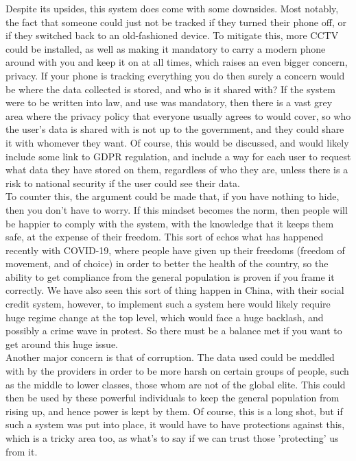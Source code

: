 
Despite its upsides, this system does come with some downsides.
Most notably, the fact that someone could just not be tracked if they turned their phone off, or if they switched
back to an old-fashioned device.
To mitigate this, more CCTV could be installed, as well as making it mandatory to carry a modern phone around with
you and keep it on at all times, which raises an even bigger concern, privacy.
If your phone is tracking everything you do then surely a concern would be where the data collected is stored, and
who is it shared with?
If the system were to be written into law, and use was mandatory, then there is a vast grey area where the
privacy policy that everyone usually agrees to would cover, so who the user's data is shared with is not up to the
government, and they could share it with whomever they want.
Of course, this would be discussed, and would likely include some link to GDPR regulation, and include a way for
each user to request what data they have stored on them, regardless of who they are, unless there is a risk to
national security if the user could see their data.
\\

To counter this, the argument could be made that, if you have nothing to hide, then you don't have to
worry.
If this mindset becomes the norm, then people will be happier to comply with the system, with the knowledge that
it keeps them safe, at the expense of their freedom.
This sort of echos what has happened recently with COVID-19, where people have given up their freedoms (freedom of
movement, and of choice) in order to better the health of the country, so the ability to get compliance from the
general population is proven if you frame it correctly.
We have also seen this sort of thing happen in China, with their social credit system, however, to implement such a
system here would likely require huge regime change at the top level, which would face a huge backlash, and
possibly a crime wave in protest.
So there must be a balance met if you want to get around this huge issue.
\\

Another major concern is that of corruption.
The data used could be meddled with by the providers in order to be more harsh on certain groups of people, such as
the middle to lower classes, those whom are not of the global elite.
This could then be used by these powerful individuals to keep the general population from rising up, and hence power
is kept by them.
Of course, this is a long shot, but if such a system was put into place, it would have to have protections against
this, which is a tricky area too, as what's to say if we can trust those 'protecting' us from it.

